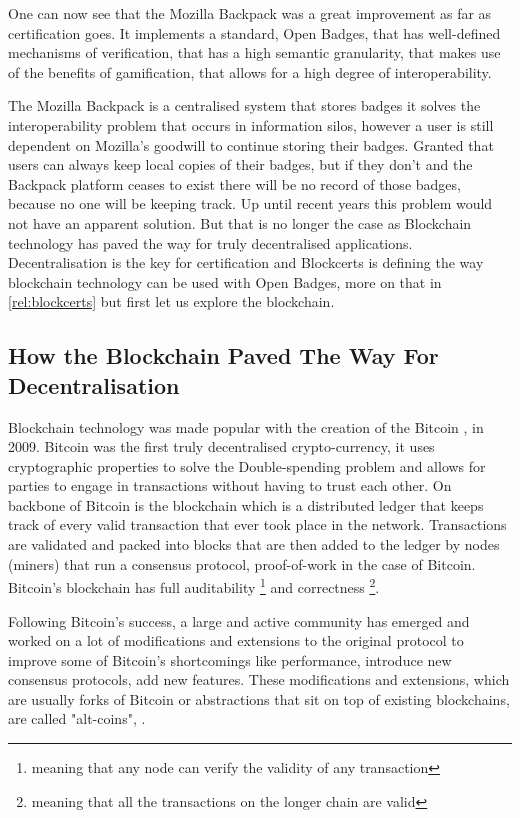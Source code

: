 \documentclass[llncsdoc]{llncs}
\begin{document}
One can now see that the Mozilla Backpack was a great improvement as far as certification goes. It implements a standard, Open Badges, that has well-defined mechanisms of verification, that has a high semantic granularity, that makes use of the benefits of gamification, that allows for a high degree of interoperability. 

The Mozilla Backpack is a centralised system that stores badges it solves the interoperability problem that occurs in information silos, however a user is still dependent on Mozilla's goodwill to continue storing their badges. Granted that users can always keep local copies of their badges, but if they don't and the Backpack platform ceases to exist there will be no record of those badges, because no one will be keeping track. Up until recent years this problem would not have an apparent solution. But that is no longer the case as Blockchain technology has paved the way for truly decentralised applications. Decentralisation is the key for certification and Blockcerts is defining the way blockchain technology can be used with Open Badges, more on that in \ref{rel:blockcerts} but first let us explore the blockchain.


\subsection{How the Blockchain Paved The Way For Decentralisation}
Blockchain technology was made popular with the creation of the Bitcoin \cite{Anonymous:JOJGrvgg}, in 2009. Bitcoin was the first truly decentralised crypto-currency, it uses cryptographic properties to solve the Double-spending problem and allows for parties to engage in transactions without having to trust each other. On backbone of Bitcoin is the blockchain which is a distributed ledger that keeps track of every valid transaction that ever took place in the network. Transactions are validated and packed into blocks that are then added to the ledger by nodes (miners) that run a consensus protocol, proof-of-work in the case of Bitcoin. Bitcoin's blockchain has full auditability \footnote{meaning that any node can verify the validity of any transaction} and correctness \footnote{meaning that all the transactions on the longer chain are valid}.

Following Bitcoin's success, a large and active community has emerged and worked on a lot of modifications and extensions to the original protocol to improve some of Bitcoin's shortcomings like performance, introduce new consensus protocols, add new features. These modifications and extensions, which are usually forks of Bitcoin or abstractions that sit on top of existing blockchains, are called "alt-coins", \cite{Bonneau:2015ema}.
\end{document}

